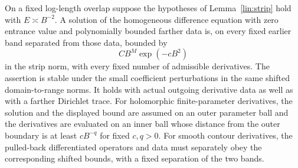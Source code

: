 \begin{lemma}\label{lin:shielding}
On a fixed log-length overlap suppose the hypotheses of
Lemma~\ref{lin:strip} hold with $E\asymp B^{-2}$.  A solution of the
homogeneous difference equation with zero entrance value and
polynomially bounded farther data is, on every fixed earlier band
separated from those data, bounded by
\begin{equation}\label{lin:shielding-estimate}
 C B^M\exp(-cB^2)
\end{equation}
in the strip norm, with every fixed number of admissible derivatives.
The assertion is stable under the small coefficient perturbations in
the same shifted domain-to-range norms.  It holds with actual outgoing
derivative data as well as with a farther Dirichlet trace.
For holomorphic finite-parameter derivatives, the solution and the
displayed bound are assumed on an outer parameter ball and the derivatives
are evaluated on an inner ball whose distance from the outer boundary is at
least $cB^{-q}$ for fixed $c,q>0$.  For smooth contour derivatives,
the pulled-back differentiated operators and data must separately obey
the corresponding shifted bounds, with a fixed separation of the two
bands.
\end{lemma}

